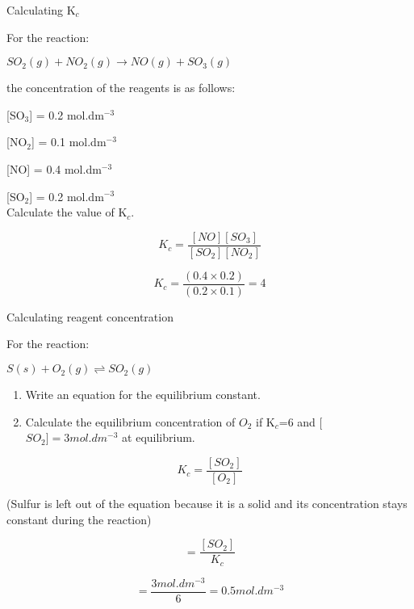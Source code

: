 \begin{wex}{Calculating K$_{c}$}{For the reaction:

\begin{center}
\rm${SO_{2}(g) + NO_{2}(g) \rightarrow NO(g) + SO_{3}(g)}$
\end{center}

the concentration of the reagents is as follows:

[SO$_{3}$] = 0.2 mol.dm$^{-3}$

[NO$_{2}$] = 0.1 mol.dm$^{-3}$

[NO] = 0.4 mol.dm$^{-3}$

[SO$_{2}$] = 0.2 mol.dm$^{-3}$\\

Calculate the value of K$_{c}$.\\
}

{

\begin{equation*}
K_{c} = \frac{[NO][SO_{3}]}{[SO_{2}][NO_{2}]}
\end{equation*}


\begin{equation*}
K_{c} = \frac{(0.4 \times 0.2)}{(0.2 \times 0.1)} = 4
\end{equation*}
}
\end{wex}

\begin{wex}{Calculating reagent concentration}{For the reaction:
\begin{center}
$S(s) + O_{2}(g) \rightleftharpoons SO_{2}(g)$
\end{center}

\begin{enumerate}
\item{Write an equation for the equilibrium constant.}
\item{Calculate the equilibrium concentration of $O_{2}$ if K$_{c}$=6 and
  [$SO_{2}]=3 mol. dm^{-3}$ at equilibrium.}   
\end{enumerate} }
{

\begin{equation*}
K_{c} = \frac{[SO_{2}]}{[O_{2}]}
\end{equation*}

(Sulfur is left out of the equation because it is a solid and its concentration stays constant during the reaction)\\

\begin{equation*}
[O_{2}] = \frac{[SO_{2}]}{K_{c}}
\end{equation*}

\begin{equation*}
[O_{2}] = \frac{3 mol.dm^{-3}}{6} = 0.5 mol.dm^{-3}
\end{equation*}
}
\end{wex}  

